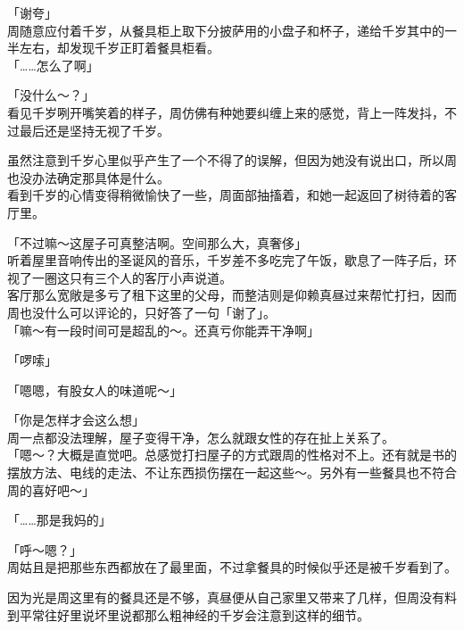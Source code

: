 「谢夸」\\

周随意应付着千岁，从餐具柜上取下分披萨用的小盘子和杯子，递给千岁其中的一半左右，却发现千岁正盯着餐具柜看。\\

「……怎么了啊」

「没什么～？」\\

看见千岁咧开嘴笑着的样子，周仿佛有种她要纠缠上来的感觉，背上一阵发抖，不过最后还是坚持无视了千岁。

虽然注意到千岁心里似乎产生了一个不得了的误解，但因为她没有说出口，所以周也没办法确定那具体是什么。\\

看到千岁的心情变得稍微愉快了一些，周面部抽搐着，和她一起返回了树待着的客厅里。\\

\vspace{2\baselineskip}

「不过嘛～这屋子可真整洁啊。空间那么大，真奢侈」\\

听着屋里音响传出的圣诞风的音乐，千岁差不多吃完了午饭，歇息了一阵子后，环视了一圈这只有三个人的客厅小声说道。\\

客厅那么宽敞是多亏了租下这里的父母，而整洁则是仰赖真昼过来帮忙打扫，因而周也没什么可以评论的，只好答了一句「谢了」。\\

「嘛～有一段时间可是超乱的～。还真亏你能弄干净啊」

「啰嗦」

「嗯嗯，有股女人的味道呢～」

「你是怎样才会这么想」\\

周一点都没法理解，屋子变得干净，怎么就跟女性的存在扯上关系了。\\

「嗯～？大概是直觉吧。总感觉打扫屋子的方式跟周的性格对不上。还有就是书的摆放方法、电线的走法、不让东西损伤摆在一起这些～。另外有一些餐具也不符合周的喜好吧～」

「……那是我妈的」

「呼～嗯？」\\

周姑且是把那些东西都放在了最里面，不过拿餐具的时候似乎还是被千岁看到了。

因为光是周这里有的餐具还是不够，真昼便从自己家里又带来了几样，但周没有料到平常往好里说坏里说都那么粗神经的千岁会注意到这样的细节。\\

